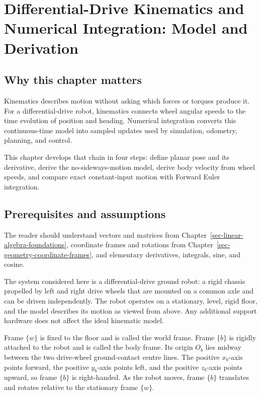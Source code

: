 \documentclass[
  australian,
  12pt,
  letterpaper,
  DIV=11,
  numbers=noendperiod,
  twoside]{scrreprt}
\begin{document}
\chapter{Differential-Drive Kinematics and Numerical Integration: Model
and Derivation}\label{sec-differential-drive-model}

\section*{Why this chapter matters}\label{why-this-chapter-matters}


Kinematics describes motion without asking which forces or torques
produce it. For a differential-drive robot, kinematics connects wheel
angular speeds to the time evolution of position and heading. Numerical
integration converts this continuous-time model into sampled updates
used by simulation, odometry, planning, and control.

This chapter develops that chain in four steps: define planar pose and
its derivative, derive the no-sideways-motion model, derive body
velocity from wheel speeds, and compare exact constant-input motion with
Forward Euler integration.

\section*{Prerequisites and
assumptions}\label{prerequisites-and-assumptions-2}


The reader should understand vectors and matrices from
Chapter~\ref{sec-linear-algebra-foundations}, coordinate frames and
rotations from Chapter~\ref{sec-geometry-coordinate-frames}, and
elementary derivatives, integrals, sine, and cosine.

The system considered here is a differential-drive ground robot: a rigid
chassis propelled by left and right drive wheels that are mounted on a
common axle and can be driven independently. The robot operates on a
stationary, level, rigid floor, and the model describes its motion as
viewed from above. Any additional support hardware does not affect the
ideal kinematic model.

Frame \(\{w\}\) is fixed to the floor and is called the world frame.
Frame \(\{b\}\) is rigidly attached to the robot and is called the body
frame. Its origin \(O_b\) lies midway between the two drive-wheel
ground-contact centre lines. The positive \(x_b\)-axis points forward,
the positive \(y_b\)-axis points left, and the positive \(z_b\)-axis
points upward, so frame \(\{b\}\) is right-handed. As the robot moves,
frame \(\{b\}\) translates and rotates relative to the stationary frame
\(\{w\}\).
\end{document}
